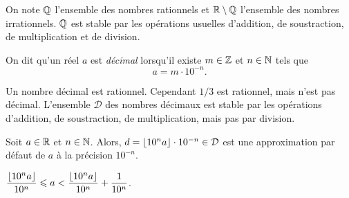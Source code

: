 \documentclass{magnolia}
\begin{document}
\begin{remarques}
\remarque On note $\mathbb{Q}$ l'ensemble des nombres rationnels et $\mathbb{R}\setminus\mathbb{Q}$ l'ensemble
  des nombres irrationnels. $\mathbb{Q}$ est stable par les opérations usuelles d'addition, de
	soustraction, de multiplication et de division.
\end{remarques}

\begin{definition}[utile=-3]
On dit qu'un réel $a$ est \emph{décimal} lorsqu'il existe $m\in\mathbb{Z}$ et $n\in\mathbb{N}$ tels
que
\[a=m\cdot 10^{-n}.\]
\end{definition}

\begin{remarques}
\remarque Un nombre décimal est rationnel. Cependant $1/3$ est rationnel, mais
  n'est pas décimal.
\remarque L'ensemble $\mathcal{D}$ des nombres décimaux est stable par les
  opérations d'addition, de soustraction, de multiplication, mais pas par
  division.
\end{remarques}

\begin{proposition}
Soit $a\in\mathbb{R}$ et $n\in\mathbb{N}$. Alors, $d=\left\lfloor10^n a\right\rfloor\cdot 10^{-n}\in\mathcal{D}$
est une approximation par défaut de $a$ à la précision $10^{-n}$.
\end{proposition}

\begin{preuve}
$\dfrac{\left\lfloor10^na\right\rfloor}{10^n}\leqslant a< \dfrac{\left\lfloor10^na\right\rfloor}{10^n}+\dfrac{1}{10^n}$.
\end{preuve}


\end{document}
